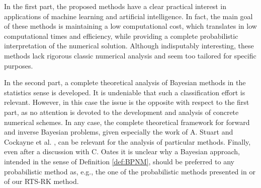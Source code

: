 \documentclass{scrartcl}
\theoremstyle{definition}
\theoremstyle{remark}
\numberwithin{definition}{section}
\numberwithin{remark}{section}
\begin{document}
In the first part, the proposed methods have a clear practical interest in applications of machine learning and artificial intelligence. In fact, the main goal of these methods is maintaining a low computational cost, which translates in low computational times and efficiency, while providing a complete probabilistic interpretation of the numerical solution. Although indisputably interesting, these methods lack rigorous classic numerical analysis and seem too tailored for specific purposes. 

In the second part, a complete theoretical analysis of Bayesian methods in the statistics sense is developed. It is undeniable that such a classification effort is relevant. However, in this case the issue is the opposite with respect to the first part, as no attention is devoted to the development and analysis of concrete numerical schemes. In any case, the complete theoretical framework for forward and inverse Bayesian problems, given especially the work of A. Stuart \cite{Stu10} and Cockayne et al. \cite{COS17}, can be relevant for the analysis of particular methods. Finally, even after a discussion with C. Oates it is unclear why a Bayesian approach, intended in the sense of Definition \ref{def:BPNM}, should be preferred to any probabilistic method as, e.g., the one of the probabilistic methods presented in \cite{CGS16} or of our RTS-RK method.



\end{document}

